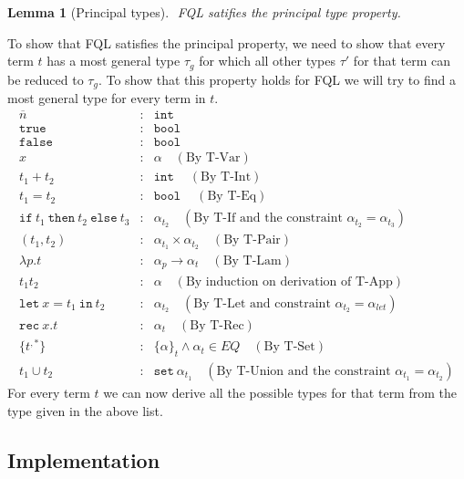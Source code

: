\documentclass[a4paper]{article}
\newcommand{\s}[1]{\mathtt{#1}}
\newcommand{\sn}{\overline{n}}
\newcommand{\sLb}{\s{\{}}
\newcommand{\sRb}{\s{\}}}
\newcommand{\sbool}{\s{bool\ }}
\newcommand{\sint}{\s{int\ }}
\newcommand{\sseta}{\s{set\ }}
\newcommand{\sif}{\s{if\ }}
\newcommand{\sthen}{\s{\ then\ }}
\newcommand{\selse}{\s{\ else\ }}
\newcommand{\sletin}[2]{\s{let\ } #1 \s{\ in\ } #2}
\newcommand{\srec}{\s{rec\ }}
\newcommand{\strue}{\s{true}}
\newcommand{\sfalse}{\s{false}}
\newcommand{\sset}[1]{\sLb #1 \sRb}
\newtheorem{lemma}{Lemma}[section]
\begin{document}
\begin{lemma}[Principal types] $ $
  \label{lemma:principalTypes}
  FQL satifies the principal type property.
\end{lemma}
To show that FQL satisfies the principal property, we need to show that every term $t$ has a most general type $\tau_g$ for which all other types $\tau'$ for that term can be reduced to $\tau_g$. To show that this property holds for FQL we will try to find a most general type for every term in $t$.
\begin{eqnarray*}
\sn &:& \sint\\
\strue &:& \sbool\\
\sfalse &:& \sbool\\
x &:& \alpha \quad(\text{By T-Var})\\
t_1 + t_2 &:& \sint \quad(\text{By T-Int})\\
t_1 = t_2 &:& \sbool \quad(\text{By T-Eq})\\
\sif t_1 \sthen t_2 \selse t_3 &:& \alpha_{t_2} \quad(\text{By T-If and the constraint } \alpha_{t_2} = \alpha_{t_3})\\
(t_1, t_2) &:& \alpha_{t_1} \times \alpha_{t_2} \quad(\text{By T-Pair})\\
\lambda p.t &:& \alpha_p \to \alpha_t \quad(\text{By T-Lam})\\
t_1t_2 &:& \alpha \quad(\text{By induction on derivation of T-App})\\
\sletin{x=t_1}{t_2} &:& \alpha_{t_2} \quad(\text{By T-Let and constraint }\alpha_{t_2} = \alpha_{let})\\
\srec x.t &:& \alpha_t \quad(\text{By T-Rec})\\
\sLb t^{,*} \sRb &:& \sset \alpha_t \wedge \alpha_t \in EQ \quad(\text{By T-Set})\\
t_1 \cup t_2 &:& \sseta \alpha_{t_1} \quad(\text{By T-Union and the constraint }\alpha_{t_1} = \alpha_{t_2})
\end{eqnarray*}
For every term $t$ we can now derive all the possible types for that term from the type given in the above list.


\newpage
\begin{appendices}


\section{Implementation}
\label{appendix:implementation}



\end{appendices}

\newpage


\end{document}
